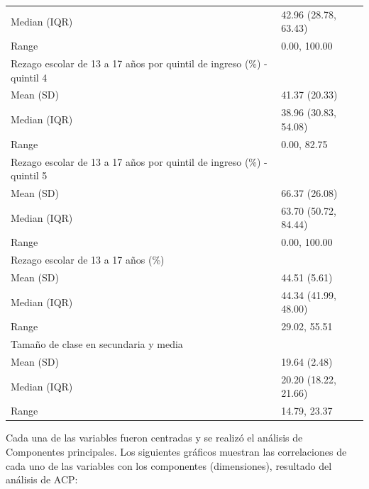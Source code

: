 \begin{table}
\begin{tabular}{ll}
\hspace{1em}Median (IQR) & 42.96 (28.78, 63.43)\\
\hspace{1em}Range & 0.00, \vphantom{1} 100.00\\
Rezago escolar de 13 a 17 años por quintil de ingreso (\%) - quintil 4 & \\
\addlinespace
\hspace{1em}Mean (SD) & 41.37 (20.33)\\
\hspace{1em}Median (IQR) & 38.96 (30.83, 54.08)\\
\hspace{1em}Range & 0.00, 82.75\\
Rezago escolar de 13 a 17 años por quintil de ingreso (\%) - quintil 5 & \\
\hspace{1em}Mean (SD) & 66.37 (26.08)\\
\addlinespace
\hspace{1em}Median (IQR) & 63.70 (50.72, 84.44)\\
\hspace{1em}Range & 0.00, 100.00\\
Rezago escolar de 13 a 17 años (\%) & \\
\hspace{1em}Mean (SD) & 44.51 (5.61)\\
\hspace{1em}Median (IQR) & 44.34 (41.99, 48.00)\\
\addlinespace
\hspace{1em}Range & 29.02, 55.51\\
Tamaño de clase en secundaria y media & \\
\hspace{1em}Mean (SD) & 19.64 (2.48)\\
\hspace{1em}Median (IQR) & 20.20 (18.22, 21.66)\\
\hspace{1em}Range & 14.79, 23.37\\
\bottomrule
\end{tabular}
\endgroup{}
\end{table}

Cada una de las variables fueron centradas y se realizó el análisis de
Componentes principales. Los siguientes gráficos muestran las
correlaciones de cada uno de las variables con los componentes
(dimensiones), resultado del análisis de ACP:

